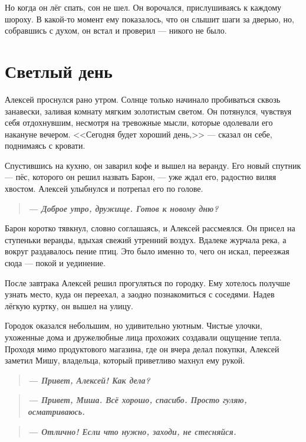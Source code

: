 \documentclass[12pt,a4paper]{book}
\newenvironment{dialogue}{\begin{quote}\itshape}{\end{quote}}
\begin{document}
Но когда он лёг спать, сон не шел. Он ворочался, прислушиваясь к каждому шороху. В какой-то момент ему показалось, что он слышит шаги за дверью, но, собравшись с духом, он встал и проверил --- никого не было.

\chapter{Светлый день}

Алексей проснулся рано утром. Солнце только начинало пробиваться сквозь занавески, заливая комнату мягким золотистым светом. Он потянулся, чувствуя себя отдохнувшим, несмотря на тревожные мысли, которые одолевали его накануне вечером. <<Сегодня будет хороший день,>> --- сказал он себе, поднимаясь с кровати.

Спустившись на кухню, он заварил кофе и вышел на веранду. Его новый спутник --- пёс, которого он решил назвать Барон, --- уже ждал его, радостно виляя хвостом. Алексей улыбнулся и потрепал его по голове.

\begin{dialogue}
\textbf{--- Доброе утро, дружище. Готов к новому дню?}
\end{dialogue}

Барон коротко тявкнул, словно соглашаясь, и Алексей рассмеялся. Он присел на ступеньки веранды, вдыхая свежий утренний воздух. Вдалеке журчала река, а вокруг раздавалось пение птиц. Это было именно то, чего он искал, переезжая сюда --- покой и уединение.

После завтрака Алексей решил прогуляться по городку. Ему хотелось получше узнать место, куда он переехал, а заодно познакомиться с соседями. Надев лёгкую куртку, он вышел на улицу.

Городок оказался небольшим, но удивительно уютным. Чистые улочки, ухоженные дома и дружелюбные лица прохожих создавали ощущение тепла. Проходя мимо продуктового магазина, где он вчера делал покупки, Алексей заметил Мишу, владельца, который приветливо махнул ему рукой.

\begin{dialogue}
\textbf{--- Привет, Алексей! Как дела?}
\end{dialogue}

\begin{dialogue}
\textbf{--- Привет, Миша. Всё хорошо, спасибо. Просто гуляю, осматриваюсь.}
\end{dialogue}

\begin{dialogue}
\textbf{--- Отлично! Если что нужно, заходи, не стесняйся.}
\end{dialogue}
\end{document}
